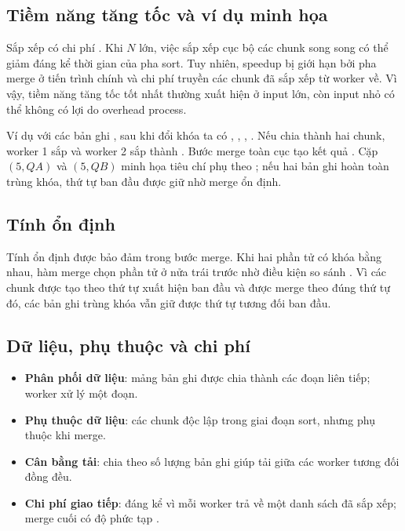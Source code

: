 \subsection{Tiềm năng tăng tốc và ví dụ minh họa}
Sắp xếp có chi phí . Khi $N$ lớn, việc sắp xếp cục bộ các chunk song song có thể giảm đáng kể thời gian của pha sort. Tuy nhiên, speedup bị giới hạn bởi pha merge ở tiến trình chính và chi phí truyền các chunk đã sắp xếp từ worker về. Vì vậy, tiềm năng tăng tốc tốt nhất thường xuất hiện ở input lớn, còn input nhỏ có thể không có lợi do overhead process.

Ví dụ với các bản ghi , sau khi đổi khóa ta có , , , . Nếu chia thành hai chunk, worker 1 sắp  và worker 2 sắp  thành . Bước merge toàn cục tạo kết quả . Cặp $(5, QA)$ và $(5, QB)$ minh họa tiêu chí phụ theo ; nếu hai bản ghi hoàn toàn trùng khóa, thứ tự ban đầu được giữ nhờ merge ổn định.

\subsection{Tính ổn định}
Tính ổn định được bảo đảm trong bước merge. Khi hai phần tử có khóa bằng nhau, hàm merge chọn phần tử ở nửa trái trước nhờ điều kiện so sánh . Vì các chunk được tạo theo thứ tự xuất hiện ban đầu và được merge theo đúng thứ tự đó, các bản ghi trùng khóa vẫn giữ được thứ tự tương đối ban đầu.

\subsection{Dữ liệu, phụ thuộc và chi phí}
\begin{itemize}
  \item \textbf{Phân phối dữ liệu}: mảng bản ghi được chia thành các đoạn liên tiếp; worker xử lý một đoạn.
  \item \textbf{Phụ thuộc dữ liệu}: các chunk độc lập trong giai đoạn sort, nhưng phụ thuộc khi merge.
  \item \textbf{Cân bằng tải}: chia theo số lượng bản ghi giúp tải giữa các worker tương đối đồng đều.
  \item \textbf{Chi phí giao tiếp}: đáng kể vì mỗi worker trả về một danh sách đã sắp xếp; merge cuối có độ phức tạp .
\end{itemize}

